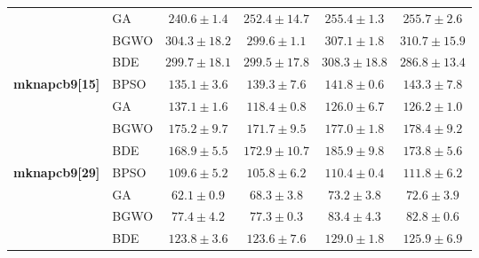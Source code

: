 \begin{table}[htbp]
\begin{tabular*}{\textwidth}{@{\extracolsep{\fill}}llcccc@{}}
                       & GA    & $\mathbf{240.6 \pm 1.4}$ &         $252.4 \pm 14.7$ &          $255.4 \pm 1.3$ &          $255.7 \pm 2.6$ \\
                       & BGWO  &         $304.3 \pm 18.2$ & $\mathbf{299.6 \pm 1.1}$ &          $307.1 \pm 1.8$ &         $310.7 \pm 15.9$ \\
                       & BDE   &         $299.7 \pm 18.1$ &         $299.5 \pm 17.8$ &         $308.3 \pm 18.8$ & $\mathbf{286.8 \pm 13.4}$ \\
    \midrule
    \textbf{mknapcb9[15]} & BPSO  & $\mathbf{135.1 \pm 3.6}$ &          $139.3 \pm 7.6$ &          $141.8 \pm 0.6$ &          $143.3 \pm 7.8$ \\
                       & GA    &          $137.1 \pm 1.6$ & $\mathbf{118.4 \pm 0.8}$ &          $126.0 \pm 6.7$ &          $126.2 \pm 1.0$ \\
                       & BGWO  &          $175.2 \pm 9.7$ & $\mathbf{171.7 \pm 9.5}$ &          $177.0 \pm 1.8$ &          $178.4 \pm 9.2$ \\
                       & BDE   & $\mathbf{168.9 \pm 5.5}$ &         $172.9 \pm 10.7$ &          $185.9 \pm 9.8$ &          $173.8 \pm 5.6$ \\
    \midrule
    \textbf{mknapcb9[29]} & BPSO  &          $109.6 \pm 5.2$ & $\mathbf{105.8 \pm 6.2}$ &          $110.4 \pm 0.4$ &          $111.8 \pm 6.2$ \\
                       & GA    &  $\mathbf{62.1 \pm 0.9}$ &           $68.3 \pm 3.8$ &           $73.2 \pm 3.8$ &           $72.6 \pm 3.9$ \\
                       & BGWO  &           $77.4 \pm 4.2$ &  $\mathbf{77.3 \pm 0.3}$ &           $83.4 \pm 4.3$ &           $82.8 \pm 0.6$ \\
                       & BDE   &          $123.8 \pm 3.6$ & $\mathbf{123.6 \pm 7.6}$ &          $129.0 \pm 1.8$ &          $125.9 \pm 6.9$ \\
    \bottomrule
  \end{tabular*}
\end{table}
